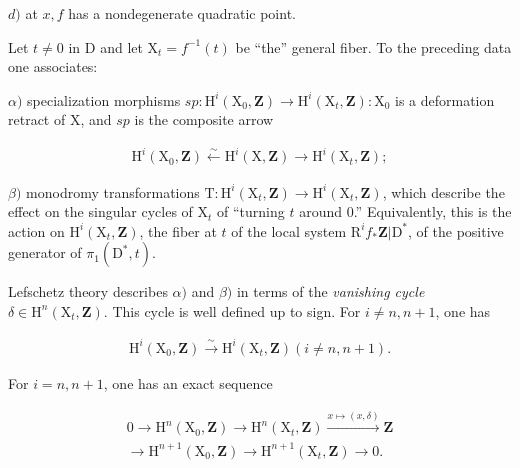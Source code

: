 \documentclass[10pt,leqno]{article}
\begin{document}
\noindent \(d)\) at \(x, f\) has a nondegenerate quadratic point.\par

\noindent Let \(t\ne 0\) in \(\mathrm{D}\) and let \(\mathrm{X}_{t}=f^{- 1}(t)\) be “the” general fiber. To the preceding data one associates:\par

\noindent \(\alpha )\) specialization morphisms \(\mathit{sp} : \mathrm{H}^{i}(\mathrm{X}_{0},\mathbf{Z})\longrightarrow \mathrm{H}^{i}(\mathrm{X}_{t},\mathbf{Z}): \mathrm{X}_{0}\) is a deformation retract of \(\mathrm{X}\), and \(\mathit{sp}\) is the composite arrow\par

\begin{equation*}\begin{gathered}\mathrm{H}^{i}(\mathrm{X}_{0},\mathbf{Z}) \xleftarrow{\sim } \mathrm{H}^{i}(\mathrm{X},\mathbf{Z}) \longrightarrow  \mathrm{H}^{i}(\mathrm{X}_{t},\mathbf{Z});\end{gathered}\end{equation*}

\noindent \(\beta )\) monodromy transformations \(\mathrm{T} : \mathrm{H}^{i}(\mathrm{X}_{t},\mathbf{Z})\longrightarrow \mathrm{H}^{i}(\mathrm{X}_{t},\mathbf{Z})\), which describe the effect on the singular cycles of \(\mathrm{X}_{t}\) of “turning \(t\) around 0.” Equivalently, this is the action on \(\mathrm{H}^{i}(\mathrm{X}_{t},\mathbf{Z})\), the fiber at \(t\) of the local system \(\mathrm{R}^{i} f_{*}\mathbf{Z}|\mathrm{D}^{*}\), of the positive generator of \(\pi _{1}(\mathrm{D}^{*},t)\).\par

\noindent Lefschetz theory describes \(\alpha )\) and \(\beta )\) in terms of the \emph{vanishing cycle} \(\delta \in \mathrm{H}^{n}(\mathrm{X}_{t},\mathbf{Z})\). This cycle is well defined up to sign. For \(i\ne n,n+1\), one has\par

\begin{equation*}\begin{gathered}\mathrm{H}^{i}(\mathrm{X}_{0},\mathbf{Z}) \xrightarrow{\sim } \mathrm{H}^{i}(\mathrm{X}_{t},\mathbf{Z})    (i\ne n,n+1).\end{gathered}\end{equation*}

\noindent For \(i=n,n+1\), one has an exact sequence\par

\begin{equation*}\begin{gathered}0 \longrightarrow  \mathrm{H}^{n}(\mathrm{X}_{0},\mathbf{Z}) \longrightarrow  \mathrm{H}^{n}(\mathrm{X}_{t},\mathbf{Z}) \xrightarrow{x\longmapsto (x,\delta )} \mathbf{Z} \\ \longrightarrow  \mathrm{H}^{n+1}(\mathrm{X}_{0},\mathbf{Z}) \longrightarrow  \mathrm{H}^{n+1}(\mathrm{X}_{t},\mathbf{Z}) \longrightarrow  0.\end{gathered}\end{equation*}
\end{document}
